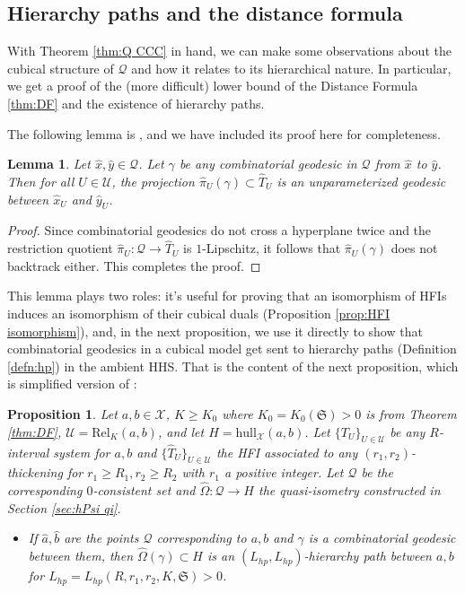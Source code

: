 \documentclass{amsart}
\newtheorem{proposition}[theorem]{Proposition}
\newtheorem{lemma}[theorem]{Lemma}
\theoremstyle{definition}
\theoremstyle{remark}
\theoremstyle{definition}
\newcommand{\calQ}{\mathcal{Q}}
\newcommand{\calU}{\mathcal{U}}
\newcommand{\calX}{\mathcal{X}}
\newcommand{\hT}{\widehat{T}}
\newcommand{\hx}{\hat{x}}
\newcommand{\ha}{\hat{a}}
\newcommand{\hb}{\hat{b}}
\newcommand{\hy}{\hat{y}}
\newcommand{\hO}{\widehat{\Omega}}
\newcommand{\hpi}{\widehat{\pi}}
\newcommand{\Rel}{\mathrm{Rel}}
\newcommand{\hull}{\mathrm{hull}}
\begin{document}
\subsection{Hierarchy paths and the distance formula}\label{subsec:HP and DF}

With Theorem \ref{thm:Q CCC} in hand, we can make some observations about the cubical structure of $\calQ$ and how it relates to its hierarchical nature.  In particular, we get a proof of the (more difficult) lower bound of the Distance Formula \ref{thm:DF} and the existence of hierarchy paths.

The following lemma is \cite[Lemma 14.7]{Dur_infcube}, and we have included its proof here for completeness.


\begin{lemma}\label{lem:NR hp in Q}
Let $\hx,\hy \in \calQ$.  Let $\gamma$ be any combinatorial geodesic in $\calQ$ from $\hx$ to $\hy$.  Then for all $U \in \calU$, the projection $\hpi_U(\gamma) \subset \hT_U$ is an unparameterized geodesic between $\hx_U$ and $\hy_U$.
\end{lemma} 

\begin{proof}
Since combinatorial geodesics do not cross a hyperplane twice and the restriction quotient $\hpi_U:\calQ \to \hT_U$ is $1$-Lipschitz, it follows that $\hpi_U(\gamma)$ does not backtrack either.  This completes the proof.





\end{proof}

This lemma plays two roles: it's useful for proving that an isomorphism of HFIs induces an isomorphism of their cubical duals (Proposition \ref{prop:HFI isomorphism}), and, in the next proposition, we use it directly to show that combinatorial geodesics in a cubical model get sent to hierarchy paths (Definition \ref{defn:hp}) in the ambient HHS.  That is the content of the next proposition, which is simplified version of \cite[Proposition 14.8]{Dur_infcube}:

\begin{proposition}\label{prop:cubical hp}
Let $a,b \in \calX$, $K \geq K_0$ where $K_0 = K_0(\mathfrak S)>0$ is from Theorem \ref{thm:DF}, $\calU = \Rel_K(a,b)$, and let $H = \hull_{\calX}(a,b)$.  Let $\{T_U\}_{U \in \calU}$ be any $R$-interval system for $a,b$ and $\{\hT_U\}_{U \in \calU}$ the HFI associated to any $(r_1,r_2)$-thickening for $r_1 \geq R_1, r_2 \geq R_2$  with $r_1$ a positive integer.  Let $\calQ$ be the corresponding $0$-consistent set and $\hO:\calQ \to H$ the quasi-isometry constructed in Section \ref{sec:hPsi qi}.
\begin{itemize}
\item If $\ha, \hb$ are the points $\calQ$ corresponding to $a, b$ and $\gamma$ is a combinatorial geodesic between them, then $\hO(\gamma) \subset H$ is an $(L_{hp},L_{hp})$-hierarchy path between $a,b$ for $L_{hp} = L_{hp}(R,r_1,r_2,K, \mathfrak S)>0$.
\end{itemize} 
\end{proposition}
\end{document}
